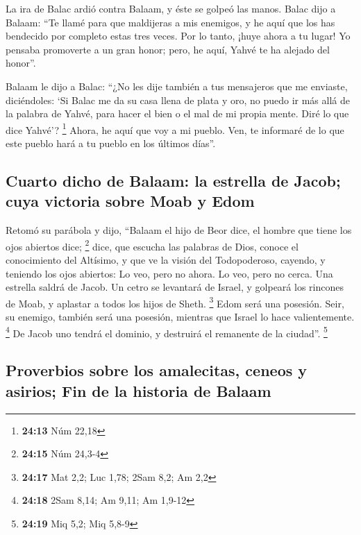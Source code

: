  La ira de Balac ardió contra Balaam, y éste se golpeó
las manos. Balac dijo a Balaam: ``Te llamé para que maldijeras a mis
enemigos, y he aquí que los has bendecido por completo estas tres veces.
 Por lo tanto, ¡huye ahora a tu lugar! Yo pensaba
promoverte a un gran honor; pero, he aquí, Yahvé te ha alejado del
honor''.

 Balaam le dijo a Balac: ``¿No les dije también a tus
mensajeros que me enviaste, diciéndoles:  `Si Balac me da
su casa llena de plata y oro, no puedo ir más allá de la palabra de
Yahvé, para hacer el bien o el mal de mi propia mente. Diré lo que dice
Yahvé'? \footnote{\textbf{24:13} Núm 22,18}  Ahora, he
aquí que voy a mi pueblo. Ven, te informaré de lo que este pueblo hará a
tu pueblo en los últimos días''.

\hypertarget{cuarto-dicho-de-balaam-la-estrella-de-jacob-cuya-victoria-sobre-moab-y-edom}{%
\subsection{Cuarto dicho de Balaam: la estrella de Jacob; cuya victoria
sobre Moab y
Edom}\label{cuarto-dicho-de-balaam-la-estrella-de-jacob-cuya-victoria-sobre-moab-y-edom}}

 Retomó su parábola y dijo, ``Balaam el hijo de Beor
dice, el hombre que tiene los ojos abiertos dice; \footnote{\textbf{24:15}
  Núm 24,3-4}  dice, que escucha las palabras de Dios,
conoce el conocimiento del Altísimo, y que ve la visión del
Todopoderoso, cayendo, y teniendo los ojos abiertos:  Lo
veo, pero no ahora. Lo veo, pero no cerca. Una estrella saldrá de Jacob.
Un cetro se levantará de Israel, y golpeará los rincones de Moab, y
aplastar a todos los hijos de Sheth. \footnote{\textbf{24:17} Mat 2,2;
  Luc 1,78; 2Sam 8,2; Am 2,2}  Edom será una posesión.
Seir, su enemigo, también será una posesión, mientras que Israel lo hace
valientemente. \footnote{\textbf{24:18} 2Sam 8,14; Am 9,11; Am 1,9-12}
 De Jacob uno tendrá el dominio, y destruirá el remanente
de la ciudad''. \footnote{\textbf{24:19} Miq 5,2; Miq 5,8-9}

\hypertarget{proverbios-sobre-los-amalecitas-ceneos-y-asirios-fin-de-la-historia-de-balaam}{%
\subsection{Proverbios sobre los amalecitas, ceneos y asirios; Fin de la
historia de
Balaam}\label{proverbios-sobre-los-amalecitas-ceneos-y-asirios-fin-de-la-historia-de-balaam}}

